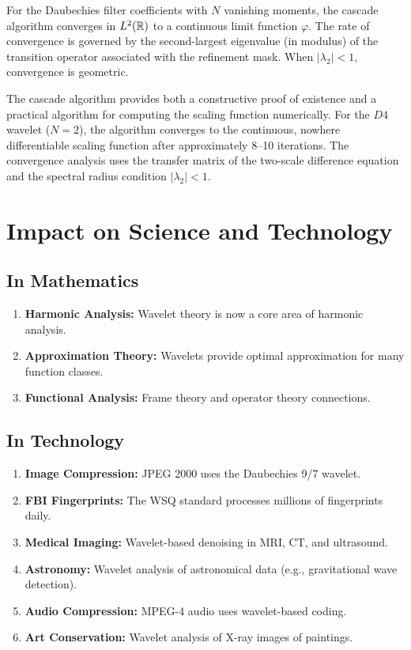 \begin{theorem}[Daubechies, 1988]
For the Daubechies filter coefficients with $N$ vanishing moments, the cascade algorithm converges in $L^2(\mathbb{R})$ to a continuous limit function $\varphi$. The rate of convergence is governed by the second-largest eigenvalue (in modulus) of the transition operator associated with the refinement mask. When $|\lambda_2| < 1$, convergence is geometric.
\end{theorem}

\begin{remark}
The cascade algorithm provides both a constructive proof of existence and a practical algorithm for computing the scaling function numerically. For the $D4$ wavelet ($N = 2$), the algorithm converges to the continuous, nowhere differentiable scaling function after approximately 8--10 iterations. The convergence analysis uses the transfer matrix of the two-scale difference equation and the spectral radius condition $|\lambda_2| < 1$.
\end{remark}

\section{Impact on Science and Technology}

\subsection{In Mathematics}

\begin{enumerate}
    \item \textbf{Harmonic Analysis:} Wavelet theory is now a core area of harmonic analysis.
    \item \textbf{Approximation Theory:} Wavelets provide optimal approximation for many function classes.
    \item \textbf{Functional Analysis:} Frame theory and operator theory connections.
\end{enumerate}

\subsection{In Technology}

\begin{enumerate}
    \item \textbf{Image Compression:} JPEG 2000 uses the Daubechies 9/7 wavelet.
    \item \textbf{FBI Fingerprints:} The WSQ standard processes millions of fingerprints daily.
    \item \textbf{Medical Imaging:} Wavelet-based denoising in MRI, CT, and ultrasound.
    \item \textbf{Astronomy:} Wavelet analysis of astronomical data (e.g., gravitational wave detection).
    \item \textbf{Audio Compression:} MPEG-4 audio uses wavelet-based coding.
    \item \textbf{Art Conservation:} Wavelet analysis of X-ray images of paintings.
\end{enumerate}

